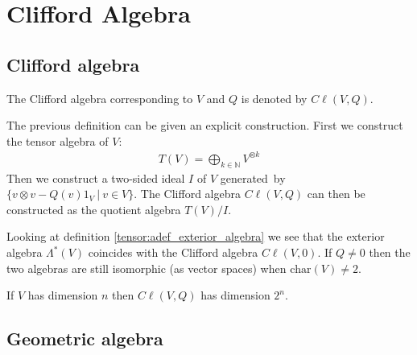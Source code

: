 \chapter{Clifford Algebra}

\section{Clifford algebra}

	\begin{notation}
		The Clifford algebra corresponding to $V$ and $Q$ is denoted by $C\ell(V, Q)$.
	\end{notation}
	
	\begin{construct}
		The previous definition can be given an explicit construction. First we construct the tensor algebra of $V$:
		\begin{gather}
			T(V) = \bigoplus_{k\in\mathbb{N}}V^{\otimes k}
		\end{gather}
		Then we construct a two-sided ideal $I$ of $V$ generated\footnotemark\ by $\{v\otimes v - Q(v)1_V\ |\ v\in V\}$. The Clifford algebra $C\ell(V, Q)$ can then be constructed as the quotient algebra $T(V)/I$.
	\end{construct}
	
	\begin{remark}
		Looking at definition \ref{tensor:adef_exterior_algebra} we see that the exterior algebra $\Lambda^*(V)$ coincides with the Clifford algebra $C\ell(V, 0)$. If $Q\neq0$ then the two algebras are still isomorphic (as vector spaces) when $\text{char}(V)\neq2$.
	\end{remark}
	
	\begin{property}[Dimension]
		If $V$ has dimension $n$ then $C\ell(V, Q)$ has dimension $2^n$.	
	\end{property}
	
\section{Geometric algebra}


